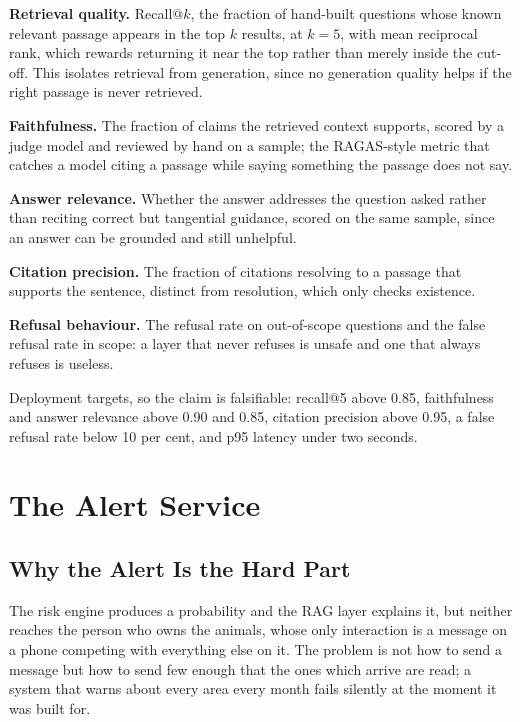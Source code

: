 \documentclass[10pt,openany]{report}
\begin{document}
\textbf{Retrieval quality.} Recall@$k$, the fraction of hand-built questions whose known relevant
passage appears in the top $k$ results, at $k=5$, with mean reciprocal rank, which rewards returning it
near the top rather than merely inside the cut-off. This isolates retrieval from generation, since no
generation quality helps if the right passage is never retrieved.

\textbf{Faithfulness.} The fraction of claims the retrieved context supports, scored by a judge model
and reviewed by hand on a sample; the RAGAS-style metric that catches a model citing a passage while
saying something the passage does not say.

\textbf{Answer relevance.} Whether the answer addresses the question asked rather than reciting
correct but tangential guidance, scored on the same sample, since an answer can be grounded and still
unhelpful.

\textbf{Citation precision.} The fraction of citations resolving to a passage that supports the
sentence, distinct from resolution, which only checks existence.

\textbf{Refusal behaviour.} The refusal rate on out-of-scope questions and the false refusal rate in
scope: a layer that never refuses is unsafe and one that always refuses is useless.

Deployment targets, so the claim is falsifiable: recall@5 above 0.85, faithfulness and answer
relevance above 0.90 and 0.85, citation precision above 0.95, a false refusal rate below 10 per cent,
and p95 latency under two seconds.

\chapter{The Alert Service}
\label{ch:alerts}

\section{Why the Alert Is the Hard Part}

The risk engine produces a probability and the RAG layer explains it, but neither reaches the person
who owns the animals, whose only interaction is a message on a phone competing with everything else on
it. The problem is not how to send a message but how to send few enough that the ones which arrive are
read; a system that warns about every area every month fails silently at the moment it was built for.
\end{document}
